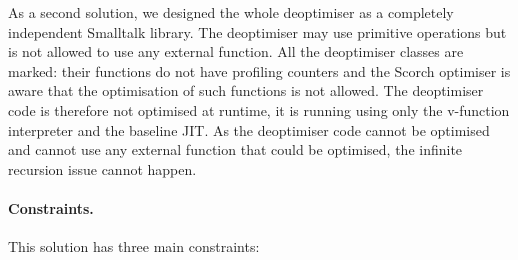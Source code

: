 \documentclass[a4paper,12pt,twoside]{../includes/ThesisStyle}
\begin{document}
As a second solution, we designed the whole deoptimiser as a completely independent Smalltalk library. The deoptimiser may use primitive operations but is not allowed to use any external function. All the deoptimiser classes are marked: their functions do not have profiling counters and the Scorch optimiser is aware that the optimisation of such functions is not allowed. The deoptimiser code is therefore not optimised at runtime, it is running using only the v-function interpreter and the baseline JIT. As the deoptimiser code cannot be optimised and cannot use any external function that could be optimised, the infinite recursion issue cannot happen.

\paragraph{Constraints.} This solution has three main constraints:
\end{document}
